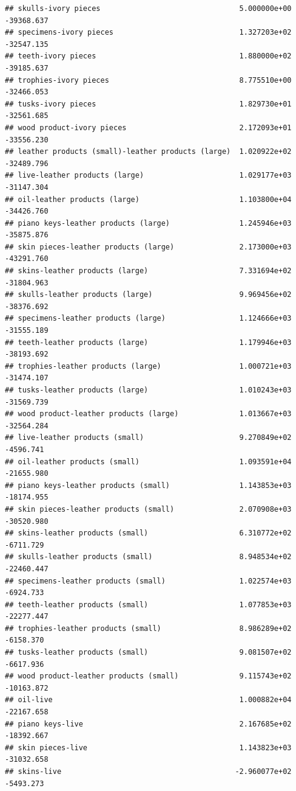 \documentclass[
  12pt,
]{article}
\begin{document}
\begin{verbatim}
## skulls-ivory pieces                                5.000000e+00  -39368.637
## specimens-ivory pieces                             1.327203e+02  -32547.135
## teeth-ivory pieces                                 1.880000e+02  -39185.637
## trophies-ivory pieces                              8.775510e+00  -32466.053
## tusks-ivory pieces                                 1.829730e+01  -32561.685
## wood product-ivory pieces                          2.172093e+01  -33556.230
## leather products (small)-leather products (large)  1.020922e+02  -32489.796
## live-leather products (large)                      1.029177e+03  -31147.304
## oil-leather products (large)                       1.103800e+04  -34426.760
## piano keys-leather products (large)                1.245946e+03  -35875.876
## skin pieces-leather products (large)               2.173000e+03  -43291.760
## skins-leather products (large)                     7.331694e+02  -31804.963
## skulls-leather products (large)                    9.969456e+02  -38376.692
## specimens-leather products (large)                 1.124666e+03  -31555.189
## teeth-leather products (large)                     1.179946e+03  -38193.692
## trophies-leather products (large)                  1.000721e+03  -31474.107
## tusks-leather products (large)                     1.010243e+03  -31569.739
## wood product-leather products (large)              1.013667e+03  -32564.284
## live-leather products (small)                      9.270849e+02   -4596.741
## oil-leather products (small)                       1.093591e+04  -21655.980
## piano keys-leather products (small)                1.143853e+03  -18174.955
## skin pieces-leather products (small)               2.070908e+03  -30520.980
## skins-leather products (small)                     6.310772e+02   -6711.729
## skulls-leather products (small)                    8.948534e+02  -22460.447
## specimens-leather products (small)                 1.022574e+03   -6924.733
## teeth-leather products (small)                     1.077853e+03  -22277.447
## trophies-leather products (small)                  8.986289e+02   -6158.370
## tusks-leather products (small)                     9.081507e+02   -6617.936
## wood product-leather products (small)              9.115743e+02  -10163.872
## oil-live                                           1.000882e+04  -22167.658
## piano keys-live                                    2.167685e+02  -18392.667
## skin pieces-live                                   1.143823e+03  -31032.658
## skins-live                                        -2.960077e+02   -5493.273

\end{verbatim}
\end{document}
